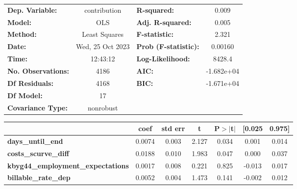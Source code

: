 \begin{center}
\begin{tabular}{lclc}
\toprule
\textbf{Dep. Variable:}                     &   contribution   & \textbf{  R-squared:         } &     0.009   \\
\textbf{Model:}                             &       OLS        & \textbf{  Adj. R-squared:    } &     0.005   \\
\textbf{Method:}                            &  Least Squares   & \textbf{  F-statistic:       } &     2.321   \\
\textbf{Date:}                              & Wed, 25 Oct 2023 & \textbf{  Prob (F-statistic):} &  0.00160    \\
\textbf{Time:}                              &     12:43:12     & \textbf{  Log-Likelihood:    } &    8428.4   \\
\textbf{No. Observations:}                  &        4186      & \textbf{  AIC:               } & -1.682e+04  \\
\textbf{Df Residuals:}                      &        4168      & \textbf{  BIC:               } & -1.671e+04  \\
\textbf{Df Model:}                          &          17      & \textbf{                     } &             \\
\textbf{Covariance Type:}                   &    nonrobust     & \textbf{                     } &             \\
\bottomrule
\end{tabular}
\begin{tabular}{lcccccc}
                                            & \textbf{coef} & \textbf{std err} & \textbf{t} & \textbf{P$> |$t$|$} & \textbf{[0.025} & \textbf{0.975]}  \\
\midrule
\textbf{days\_until\_end}                   &       0.0074  &        0.003     &     2.127  &         0.034        &        0.001    &        0.014     \\
\textbf{costs\_scurve\_diff}                &       0.0188  &        0.010     &     1.983  &         0.047        &        0.000    &        0.037     \\
\textbf{kbyg44\_employment\_expectations}   &       0.0017  &        0.008     &     0.221  &         0.825        &       -0.013    &        0.017     \\
\textbf{billable\_rate\_dep}                &       0.0052  &        0.004     &     1.473  &         0.141        &       -0.002    &        0.012     \\

\end{tabular}
\end{center}
